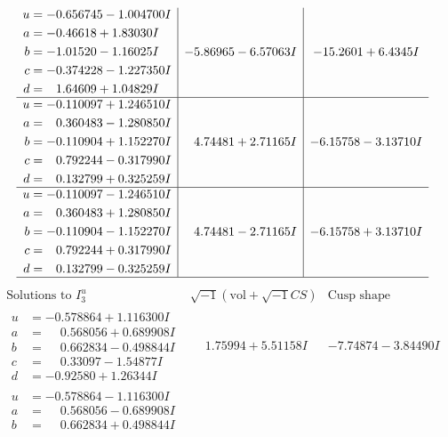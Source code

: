 \documentclass[1p]{elsarticle_modified}
\theoremstyle{definition}
\newcommand{\I}{\sqrt{-1}}
\begin{document}
$$\begin{array}{c|c|c}
\begin{aligned}
u &= -0.656745 - 1.004700 I \\
a &= -0.46618 + 1.83030 I \\
b &= -1.01520 - 1.16025 I \\
c &= -0.374228 - 1.227350 I \\
d &= \phantom{-}1.64609 + 1.04829 I\end{aligned}
 & -5.86965 - 6.57063 I & -15.2601 + 6.4345 I \\ \hline\begin{aligned}
u &= -0.110097 + 1.246510 I \\
a &= \phantom{-}0.360483 - 1.280850 I \\
b &= -0.110904 + 1.152270 I \\
c &= \phantom{-}0.792244 - 0.317990 I \\
d &= \phantom{-}0.132799 + 0.325259 I\end{aligned}
 & \phantom{-}4.74481 + 2.71165 I & -6.15758 - 3.13710 I \\ \hline\begin{aligned}
u &= -0.110097 - 1.246510 I \\
a &= \phantom{-}0.360483 + 1.280850 I \\
b &= -0.110904 - 1.152270 I \\
c &= \phantom{-}0.792244 + 0.317990 I \\
d &= \phantom{-}0.132799 - 0.325259 I\end{aligned}
 & \phantom{-}4.74481 - 2.71165 I & -6.15758 + 3.13710 I\\
 \hline 
 \end{array}$$\newpage$$\begin{array}{c|c|c}  
\text{Solutions to }I^u_{3}& \I (\text{vol} + \sqrt{-1}CS) & \text{Cusp shape}\\
 \hline 
\begin{aligned}
u &= -0.578864 + 1.116300 I \\
a &= \phantom{-}0.568056 + 0.689908 I \\
b &= \phantom{-}0.662834 - 0.498844 I \\
c &= \phantom{-}0.33097 - 1.54877 I \\
d &= -0.92580 + 1.26344 I\end{aligned}
 & \phantom{-}1.75994 + 5.51158 I & -7.74874 - 3.84490 I \\ \hline\begin{aligned}
u &= -0.578864 - 1.116300 I \\
a &= \phantom{-}0.568056 - 0.689908 I \\
b &= \phantom{-}0.662834 + 0.498844 I \\

\end{aligned}
\end{array}$$
\end{document}
